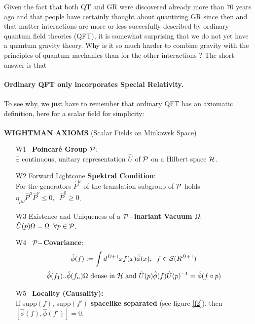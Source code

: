 \documentclass[12pt]{report}
\def\blue{\relax}
\def\red{\relax}
\def\green{\relax}
\begin{document}
Given the fact that both QT and GR were discovered already more than 70
years ago and that people have certainly thought about quantizing GR
since then and that matter interactions are more or less succesfully
described by ordinary quantum field theories (QFT), it is somewhat 
surprising that 
we do
not yet have a quantum gravity theory. Why is it so much harder to
combine gravity with the principles of quantum mechanics than for the 
other interactions ? The short answer is that \\
\\
{\bf Ordinary QFT only incorporates Special Relativity.}\\ 
\\
To see why, we just have to remember that ordinary QFT has an axiomatic
definition, here for a scalar field for simplicity:\\
\\
{\bf\blue\large WIGHTMAN AXIOMS} (Scalar Fields on Minkowsk Space)
%
\begin{itemize}
%
\item[{\green W1}] ~{\red\bf Poincar\'e Group ${\cal P}$}:\\
$\exists$ continuous, unitary representation $\hat{U}$ of 
{\red\bf ${\cal P}$} on a Hilbert space $\cal H$.
%
\item[{\green W2}] Forward Lightcone {\bf\red Spektral Condition}:\\
For the generators {\bf\red$\hat{P}^\mu$} of the translation subgroup
of {\bf\red$\cal P$} holds
{\bf\red $\eta_{\mu\nu}\hat{P}^\mu\hat{P}^\nu\le 0,\;\;\hat{P}^0\ge 0$}.
%
\item[{\green W3}] Existence and  Uniqueness of a {\bf\red 
${\cal P}-$inariant Vacuum $\Omega$}:\\
$\hat{U}(p)\Omega=\Omega\;\;\forall p\in{\cal P}$.
%
\item[{\green W4}] ~{\bf\red ${\cal P}-$Covariance}:\\
$$
\hat{\phi}(f):=\int d^{D+1}x f(x)\hat{\phi}(x),\;\;f\in 
{\cal S}(R^{D+1})$$
$$
\hat{\phi}(f_1)..\hat{\phi}(f_n){\red \Omega} \mbox{ dense in } {\cal H}
\mbox{ and } \hat{U}(p)\hat{\phi}(f)\hat{U}(p)^{-1}=\hat{\phi}(f\circ p)
$$
%
\item[{\green W5}] ~{\bf\red Locality (Causality):}\\
If supp$(f)$, supp$(f')$ {\bf\red spacelike separated} (see figure
\ref{f2}), then 
$[\hat{\phi}(f),\hat{\phi}(f')]=0$.
%
\end{itemize}
%
\end{document}
